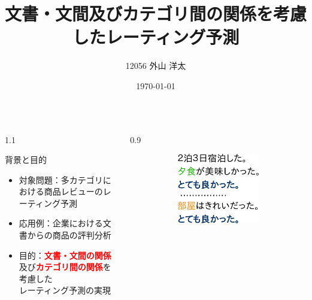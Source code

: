 \documentclass[unicode,10pt]{beamer}
\title{文書・文間及びカテゴリ間の関係を考慮したレーティング予測}
\institute{知能数理研究室}
\author{12056 外山 洋太}
\date{\today}
\newlength{\mycolumnwidth}
\newcommand{\fire}[1]{\textcolor{red}{\textbf{#1}}}
\begin{document}
\begin{frame}[t]
\vspace{-1em} %

\begin{columns}[onlytextwidth,t]
  \begin{column}{1.1\mycolumnwidth}
    \begin{block}{背景と目的}
      \begin{itemize}
        \item 対象問題：多カテゴリにおける商品レビューのレーティング予測
        \item 応用例：企業における文書からの商品の評判分析
        \item 目的：\fire{文書・文間の関係}及び\fire{カテゴリ間の関係}を
                    考慮した\\レーティング予測の実現
      \end{itemize}
    \end{block}
  \end{column}
  \begin{column}{0.9\mycolumnwidth}
    \begin{figure}
      \hspace*{\fill} %
      \begin{subfigure}[t]{0.38\linewidth}
        \includegraphics[width=0.9\linewidth]
                        {fig/relations_among_sentences_v3.pdf}
      \end{subfigure}
      \hfill %
      \begin{subfigure}[t]{0.52\linewidth}

\end{subfigure}
\end{figure}
\end{column}
\end{columns}
\end{frame}
\end{document}
